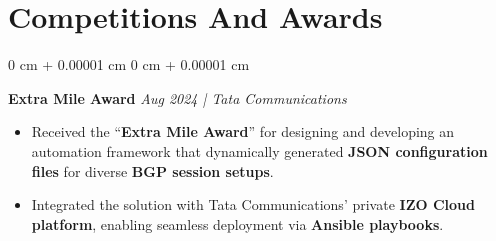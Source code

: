 \documentclass[10pt, letterpaper]{article}
\newenvironment{highlights}{
    \begin{itemize}[
        topsep=0.10 cm,
        parsep=0.10 cm,
        partopsep=0pt,
        itemsep=0pt,
        leftmargin=0 cm + 10pt
    ]
}{
    \end{itemize}
} %
\newenvironment{onecolentry}{
    \begin{adjustwidth}{
        0 cm + 0.00001 cm
    }{
        0 cm + 0.00001 cm
    }
}{
    \end{adjustwidth}
} %
\begin{document}
    \section{ Competitions And Awards}
        \begin{onecolentry}
    \textbf{Extra Mile Award} \hfill \textit{Aug 2024 | Tata Communications}
    \begin{highlights}
        \item Received the “\textbf{Extra Mile Award}” for designing and developing an automation framework that dynamically generated \textbf{JSON configuration files} for diverse \textbf{BGP session setups}.
        \item Integrated the solution with Tata Communications’ private \textbf{IZO Cloud platform}, enabling seamless deployment via \textbf{Ansible playbooks}.
    \end{highlights}
\end{onecolentry}
\end{document}
